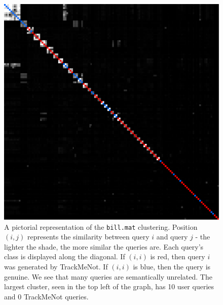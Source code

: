 \documentclass[11pt]{article}
\begin{document}
\begin{multicols}{2}
  \begin{figure}[h]
    \centering
    \includegraphics[width=\linewidth]{disco_bill_131}
    \caption{A pictorial representation of the \texttt{bill.mat}
      clustering. Position $(i,j)$ represents the similarity between
      query $i$ and query $j$ - the lighter the shade, the more
      similar the queries are. Each query's class is displayed along
      the diagonal. If $(i,i)$ is red, then query $i$ was generated by
      TrackMeNot. If $(i,i)$ is blue, then the query is genuine. We
      see that many queries are semantically unrelated. The largest
      cluster, seen in the top left of the graph, has 10 user queries
      and 0 TrackMeNot queries.}
    \label{fig:disco.bill}
  \end{figure}


\end{multicols}
\end{document}
